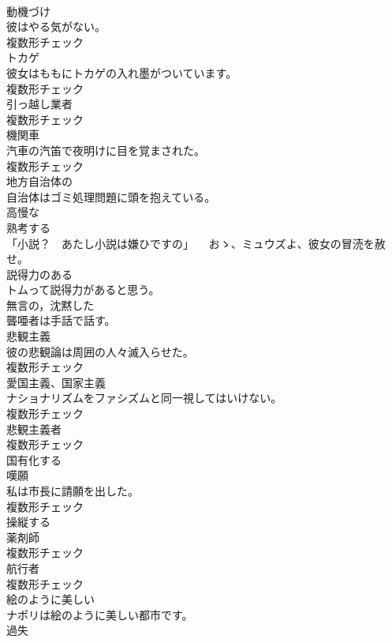 \documentclass[8pt]{extreport}
\begin{document}
\begin{CJK}{UTF8}{min}
\\	[名詞]	動機づけ	
\\	彼はやる気がない。	
\\	複数形チェック
\\	[名詞]	トカゲ	
\\	彼女はももにトカゲの入れ墨がついています。	
\\	複数形チェック
\\	[名詞]	引っ越し業者	
\\	複数形チェック
\\	[名詞]	機関車	
\\	汽車の汽笛で夜明けに目を覚まされた。	
\\	複数形チェック
\\	[形容詞]	地方自治体の	
\\	自治体はゴミ処理問題に頭を抱えている。	
\\	[形容詞]	高慢な	
\\	[動詞]	熟考する	
\\	「小説？　あたし小説は嫌ひですの」 　おゝ、ミュウズよ、彼女の冒涜を赦せ。	
\\	[形容詞]	説得力のある	
\\	トムって説得力があると思う。	
\\	[形容詞]	無言の，沈黙した	
\\	聾唖者は手話で話す。	
\\	[名詞]	悲観主義	
\\	彼の悲観論は周囲の人々滅入らせた。	
\\	複数形チェック
\\	[名詞]	愛国主義、国家主義	
\\	ナショナリズムをファシズムと同一視してはいけない。	
\\	複数形チェック
\\	[名詞]	悲観主義者	
\\	複数形チェック
\\	[動詞]	国有化する	
\\	[名詞]	嘆願	
\\	私は市長に請願を出した。	
\\	複数形チェック
\\	[動詞]	操縦する	
\\	[名詞]	薬剤師	
\\	複数形チェック
\\	[名詞]	航行者	
\\	複数形チェック
\\	[形容詞]	絵のように美しい	
\\	ナポリは絵のように美しい都市です。	
\\	[名詞]	過失	

\end{CJK}
\end{document}
